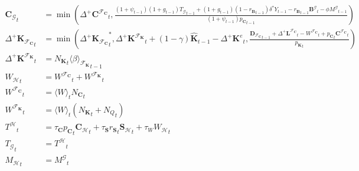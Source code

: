 \documentclass[a4paper, headings=standardclasses]{scrartcl}
\numberwithin{equation}{subsection}
\begin{document}
{\begin{align}
		{\mathbf{C}_\mathcal{G}}_t                        & = \min\left(\Delta^+ {\mathbf{C}^{\mathcal{F}_\mathbf{C}}}_t, \frac{(1+\psi_{t-1})(1+g_{t-1}){T_\mathcal{G}}_{t-1} + (1+g_{t-1})(1-{r_\mathbf{B}}_{t-1})\delta^* Y_{t-1} - {r_\mathbf{B}}_{t-1} {\mathbf{B}^\mathcal{G}}_t - \phi {M^\mathcal{G}}_{t-1}}{(1+\psi_{t-1}) {p_\mathbf{C}}_{t-1}} \right) \\
		{\Delta^+\mathbf{K}_{\mathcal{F}_\mathbf{C}}}_t   & = \min\left({\Delta^+\mathbf{K}_{\mathcal{F}_\mathbf{C}}}^*_t, {\Delta^+\mathbf{K}^{\mathcal{F}_\mathbf{K}}}_t + (1-\gamma)\hat{\mathbf{K}}_{t-1} - {\Delta^+\mathbf{K}^e}_t,  \frac{{\mathbf{D}_{\mathcal{F}_\mathbf{C}}}_{t-1} + {\Delta^+{\mathbf{L}^{\mathcal{F}_\mathbf{C}}}}_t - {W^{\mathcal{F}_\mathbf{C}}}_t + {p_{\mathbf{C}}}_t {\mathbf{C}^{\mathcal{F}_\mathbf{C}}}_t}{{p_\mathbf{K}}_t} \right) \\
		{\Delta^+\mathbf{K}^{\mathcal{F}_\mathbf{K}}}_t   & = {N_\mathbf{K}}_t {\langle \beta \rangle_{\mathcal{F}_\mathbf{K}}}_{t-1} \\
		{W_\mathcal{H}}_t                                 & = {W^{\mathcal{F}_\mathbf{C}}}_t + {W^{\mathcal{F}_\mathbf{K}}}_t                                                                                                                                                                                                             \\
		{W^{\mathcal{F}_\mathbf{C}}}_t                    & = {\langle W \rangle}_t {N_\mathbf{C}}_t  \\
		{W^{\mathcal{F}_\mathbf{K}}}_t                    & = {\langle W \rangle}_t ({N_\mathbf{K}}_t + {N_Q}_t)    \\
		{T^\mathcal{H}}_t                                 & = \tau_\mathbf{C} {p_\mathbf{C}}_t {\mathbf{C}_\mathcal{H}}_t + \tau_\mathbf{S} {r_\mathbf{S}}_t {\mathbf{S}_\mathcal{H}}_t + \tau_W {W_\mathcal{H}}_t                                                                                                                        \\
		{T_\mathcal{G}}_t                                 & = {T^\mathcal{H}}_t                                                                                                                                                                                                                                                           \\
		{M_\mathcal{H}}_t                                 & = {M^\mathcal{G}}_t                                                                                                                                                                                                                                                           \\

\end{align}}
\end{document}
